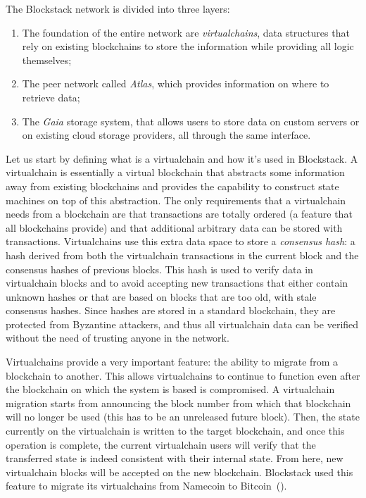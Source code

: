 \documentclass[mscthesis]{usiinfthesis}
\begin{document}
The Blockstack network is divided into three layers:
\begin{enumerate}
	\item The foundation of the entire network are \emph{virtualchains}, data structures that rely on existing blockchains to store the information while providing all logic themselves;
	\item The peer network called \emph{Atlas}, which provides information on where to retrieve data;
	\item The \emph{Gaia} storage system, that allows users to store data on custom servers or on existing cloud storage providers, all through the same interface.
\end{enumerate}

Let us start by defining what is a virtualchain and how it's used in Blockstack. A virtualchain is essentially a virtual blockchain that abstracts some information away from existing blockchains and provides the capability to construct state machines on top of this abstraction. The only requirements that a virtualchain needs from a blockchain are that transactions are totally ordered (a feature that all blockchains provide) and that additional arbitrary data can be stored with transactions. Virtualchains use this extra data space to store a \emph{consensus hash}: a hash derived from both the virtualchain transactions in the current block and the consensus hashes of previous blocks. This hash is used to verify data in virtualchain blocks and to avoid accepting new transactions that either contain unknown hashes or that are based on blocks that are too old, with stale consensus hashes. Since hashes are stored in a standard blockchain, they are protected from Byzantine attackers, and thus all virtualchain data can be verified without the need of trusting anyone in the network.

Virtualchains provide a very important feature: the ability to migrate from a blockchain to another. This allows virtualchains to continue to function even after the blockchain on which the system is based is compromised. A virtualchain migration starts from announcing the block number from which that blockchain will no longer be used (this has to be an unreleased future block). Then, the state currently on the virtualchain is written to the target blockchain, and once this operation is complete, the current virtualchain users will verify that the transferred state is indeed consistent with their internal state. From here, new virtualchain blocks will be accepted on the new blockchain. Blockstack used this feature to migrate its virtualchains from Namecoin to Bitcoin~(\cite{website:blockstackmigration}).
\end{document}
